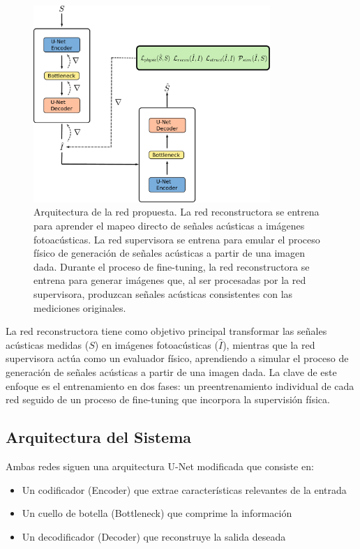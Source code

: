 \begin{figure}
    \centering
    \includegraphics[width=0.8\textwidth]{Images/arq.pdf}
    \caption{Arquitectura de la red propuesta. La red reconstructora se entrena para aprender el mapeo directo de señales acústicas a imágenes fotoacústicas. La red supervisora se entrena para emular el proceso físico de generación de señales acústicas a partir de una imagen dada. Durante el proceso de fine-tuning, la red reconstructora se entrena para generar imágenes que, al ser procesadas por la red supervisora, produzcan señales acústicas consistentes con las mediciones originales.}
    \label{fig:fine-tuning}
\end{figure}

La red reconstructora tiene como objetivo principal transformar las señales acústicas medidas ($S$) en imágenes fotoacústicas ($\hat{I}$), mientras que la red supervisora actúa como un evaluador físico, aprendiendo a simular el proceso de generación de señales acústicas a partir de una imagen dada. La clave de este enfoque es el entrenamiento en dos fases: un preentrenamiento individual de cada red seguido de un proceso de fine-tuning que incorpora la supervisión física.

\subsection{Arquitectura del Sistema}

Ambas redes siguen una arquitectura U-Net modificada que consiste en:
\begin{itemize}
    \item Un codificador (Encoder) que extrae características relevantes de la entrada
    \item Un cuello de botella (Bottleneck) que comprime la información
    \item Un decodificador (Decoder) que reconstruye la salida deseada
\end{itemize}

